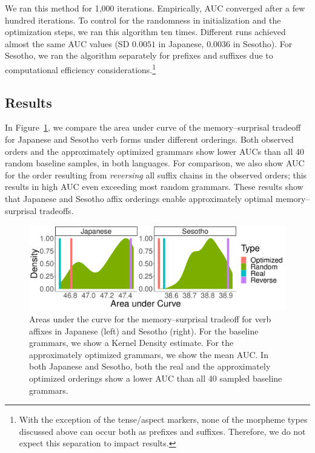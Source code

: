 We ran this method for 1,000 iterations. Empirically, AUC converged after a few hundred iterations.
To control for the randomness in initialization and the optimization steps, we ran this algorithm ten times.
Different runs achieved almost the same AUC values (SD $0.0051$ in Japanese, $0.0036$ in Sesotho). %
For Sesotho, we ran the algorithm separately for prefixes and suffixes due to computational efficiency considerations.\footnote{With the exception of the tense/aspect markers, none of the morpheme types discussed above can occur both as prefixes and suffixes. Therefore, we do not expect this separation to impact results.}

\subsection{Results}
In Figure~\ref{fig:morph-auc}, we compare the area under curve of the memory--surprisal tradeoff for Japanese and Sesotho verb forms under different orderings.
Both observed orders and the approximately optimized grammars show lower AUCs than all 40 random baseline samples, in both languages.
For comparison, we also show AUC for the order resulting from \emph{reversing} all suffix chains in the observed orders; this results in high AUC even exceeding most random grammars.
These results show that Japanese and Sesotho affix orderings enable approximately optimal memory--surprisal tradeoffs.



\begin{figure}
	\begin{center}
\includegraphics[width=\textwidth]{figures/Both-suffixes-byMorphemes-auc-hist-heldout.pdf}
\end{center}
	\caption{Areas under the curve for the memory--surprisal tradeoff for verb affixes in Japanese (left) and Sesotho (right). For the baseline grammars, we show a Kernel Density estimate.
	For the approximately optimized grammars, we show the mean AUC. %
	In both Japanese and Sesotho, both the real and the approximately optimized orderings show a lower AUC than all 40 sampled baseline grammars.}
	\label{fig:morph-auc}
\end{figure}



